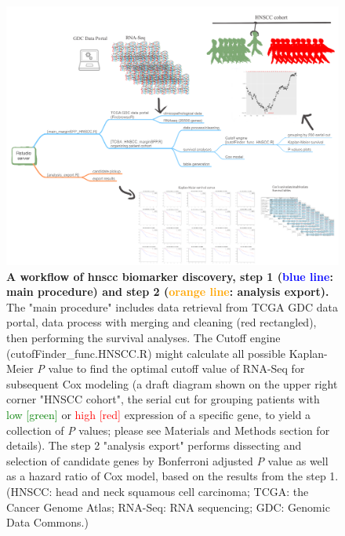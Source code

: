 \documentclass[jpm,article,submit,moreauthors,pdftex]{Definitions/mdpi}
\newcommand{\bcaption}[2]{\caption{\textbf{#1} #2}}
\begin{document}
\begin{figure}[hp]
\centering
\includegraphics[width=14cm]{Figure_1_manuscript_workflow} %
\bcaption{A workflow of \acrshort{hnscc} biomarker discovery, step 1 (\textcolor{blue}{blue line}: main procedure) and step 2 (\textcolor{orange}{orange line}: analysis export).}
{The "main procedure" includes data retrieval from TCGA GDC data portal, data process with merging and cleaning (red rectangled),%
then performing the survival analyses. The Cutoff engine (cutofFinder\_func.HNSCC.R) might calculate all possible Kaplan-Meier \textit{P} value to find the optimal cutoff value of RNA-Seq for subsequent Cox modeling (a draft diagram shown on the upper right corner "HNSCC cohort", the serial cut for grouping patients with \textcolor{green}{low [green]} or \textcolor{red}{high [red]} expression of a specific gene, to yield a collection of \textit{P} values; please see Materials and Methods section for details). The step 2 "analysis export" performs dissecting and selection of candidate genes by Bonferroni adjusted \textit{P} value as well as a hazard ratio of Cox model, based on the results from the step 1.
(HNSCC: head and neck squamous cell carcinoma; TCGA: the Cancer Genome Atlas; RNA-Seq: RNA sequencing; GDC: Genomic Data Commons.)}
\label{fig:figure1}
\end{figure}
\end{document}
